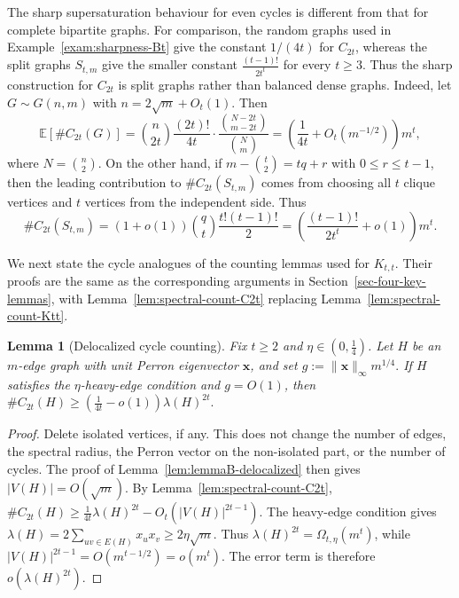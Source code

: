 \documentclass[10pt,a4paper]{amsart}
\newtheorem{lemma}[theorem]{Lemma}
\begin{document}
The sharp supersaturation behaviour for even cycles is different from
that for complete bipartite graphs.  For comparison, the random graphs used in
Example~\ref{exam:sharpness-Bt} give the constant \(1/(4t)\) for
\(C_{2t}\), whereas the split graphs \(S_{t,m}\) give the smaller
constant $\frac{(t-1)!}{2t^t}$ for every \(t\ge3\).  Thus the sharp construction for \(C_{2t}\) is
split graphs rather than balanced dense graphs. Indeed, let \(G\sim G(n,m)\) with \(n=2\sqrt m+O_t(1)\).  Then
\[
 \mathbb E[\texttt{\#}C_{2t}(G)]
 =
 {n\choose 2t}\frac{(2t)!}{4t}
 \cdot
 \frac{\binom{N-2t}{m-2t}}{\binom{N}{m}}
 =
 \left(\frac{1}{4t}+O_t(m^{-1/2})\right)m^t,
\]
where \(N=\binom n2\).  On the other hand, if
\(m-\binom t2=tq+r\) with \(0\le r\le t-1\), then the leading
contribution to \(\texttt{\#}C_{2t}(S_{t,m})\) comes from choosing all
\(t\) clique vertices and \(t\) vertices from the independent side.
Thus
\[
        \texttt{\#}C_{2t}(S_{t,m})
        =
        \left(1+o(1)\right)
        {q\choose t}\frac{t!(t-1)!}{2}
        =
        \left(\frac{(t-1)!}{2t^t}+o(1)\right)m^t .
\]

We next state the cycle analogues of the counting lemmas used for
\(K_{t,t}\).  Their proofs are the same as the corresponding arguments
in Section~\ref{sec-four-key-lemmas}, with Lemma~\ref{lem:spectral-count-C2t}
replacing Lemma~\ref{lem:spectral-count-Ktt}.

\begin{lemma}[Delocalized cycle counting]
\label{lem:cycle-delocalized}
Fix \(t\ge2\) and \(\eta\in(0,\frac14)\).  Let \(H\) be an \(m\)-edge
graph with unit Perron eigenvector \(\bm{x}\), and set $g:=\|\bm{x}\|_\infty m^{1/4}.$
If \(H\) satisfies the \(\eta\)-heavy-edge condition and \(g=O(1)\), then $\texttt{\#}C_{2t}(H)
        \ge
        \left(\frac{1}{4t}-o(1)\right)\lambda(H)^{2t}.$
\end{lemma}

\begin{proof}
Delete isolated vertices, if any.  This does not change the number of
edges, the spectral radius, the Perron vector on the non-isolated part,
or the number of cycles.  The proof of Lemma~\ref{lem:lemmaB-delocalized}
then gives \(|V(H)|=O(\sqrt m)\).  By Lemma~\ref{lem:spectral-count-C2t},
$\texttt{\#}C_{2t}(H)
        \ge
        \frac{1}{4t}\lambda(H)^{2t}-O_t(|V(H)|^{2t-1}).$
The heavy-edge condition gives
$\lambda(H)
        =
        2\sum_{uv\in E(H)}x_ux_v
        \ge
        2\eta\sqrt m.$
Thus \(\lambda(H)^{2t}=\Omega_{t,\eta}(m^t)\), while $|V(H)|^{2t-1}=O(m^{t-1/2})=o(m^t).$
The error term is therefore \(o(\lambda(H)^{2t})\).
\end{proof}
\end{document}
